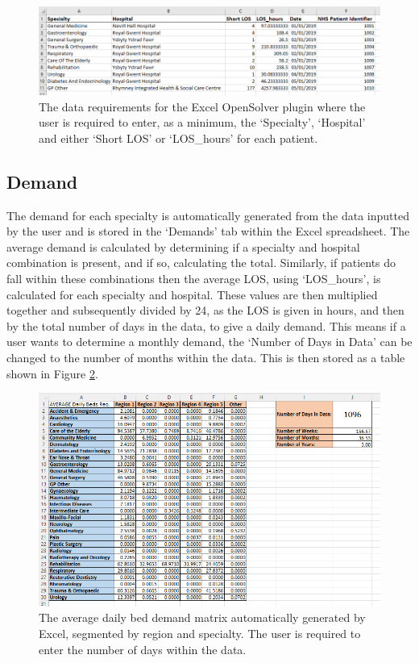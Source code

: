 \documentclass[../thesis.tex]{subfiles}
\begin{document}
\begin{figure}[h!]
    \centering
    \includegraphics[width=\textwidth]{Chapters/Chapter7/Figures/Data.png}
    \caption{The data requirements for the Excel OpenSolver plugin where the user is required to enter, as a minimum, the `Specialty', `Hospital' and either `Short LOS' or `LOS\_hours' for each patient.}
    \label{fig:exdata}
\end{figure}


\subsection*{Demand}
The demand for each specialty is automatically generated from the data inputted by the user and is stored in the `Demands' tab within the Excel spreadsheet. The average demand is calculated by determining if a specialty and hospital combination is present, and if so, calculating the total. Similarly, if patients do fall within these combinations then the average LOS, using `LOS\_hours', is calculated for each specialty and hospital. These values are then multiplied together and subsequently divided by 24, as the LOS is given in hours, and then by the total number of days in the data, to give a daily demand. This means if a user wants to determine a monthly demand, the `Number of Days in Data' can be changed to the number of months within the data. This is then stored as a table shown in Figure \ref{fig:exdemand}.
\begin{figure}[h!]
    \centering
    \includegraphics[width=\textwidth]{Chapters/Chapter7/Figures/Demands.png}
    \caption{The average daily bed demand matrix automatically generated by Excel, segmented by region and specialty. The user is required to enter the number of days within the data.}
    \label{fig:exdemand}
\end{figure}
\end{document}
